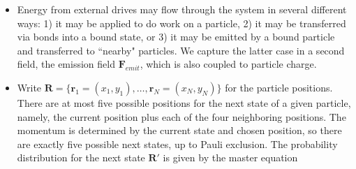 \documentclass[12pt,letterpaper]{article}
\newcommand{\mb}{\mathbf}
\begin{document}
\begin{itemize}

\item Energy from external drives may flow through the system in several different ways: 1) it may be applied to do work on a particle, 2) it may be transferred via bonds into a bound state, or 3) it may be emitted by a bound particle and transferred to ``nearby" particles. We capture the latter case in a second field, the emission field $\mb{F}_{emit}$, which is also coupled to particle charge.
\item Write $\mb{R} = \{\mb{r}_{1} = (x_{1}, y_{1}), \ldots, \mb{r}_{N} = (x_{N}, y_{N})\}$ for the particle positions. There are at most five possible positions for the next state of a given particle, namely, the current position plus each of the four neighboring positions. The momentum is determined by the current state and chosen position, so there are exactly five possible next states, up to Pauli exclusion. The probability distribution for the next state $\mb{R}'$ is given by the master equation

\end{itemize}
\end{document}
